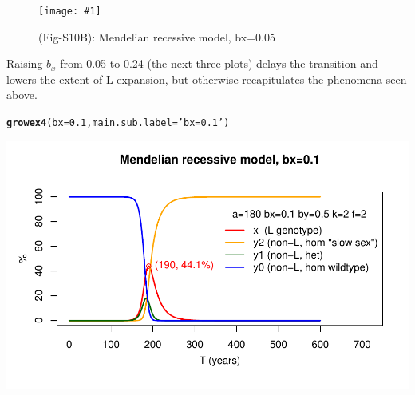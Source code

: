 \documentclass{article}\usepackage[]{graphicx}\usepackage[]{color}
\makeatletter
\def\maxwidth{ %
  \ifdim\Gin@nat@width>\linewidth
    \linewidth
  \else
    \Gin@nat@width
  \fi
}
\newcommand{\hlnum}[1]{\textcolor[rgb]{0.686,0.059,0.569}{#1}}%
\newcommand{\hlstr}[1]{\textcolor[rgb]{0.192,0.494,0.8}{#1}}%
\newcommand{\hlstd}[1]{\textcolor[rgb]{0.345,0.345,0.345}{#1}}%
\newcommand{\hlkwc}[1]{\textcolor[rgb]{0.333,0.667,0.333}{#1}}%
\newcommand{\hlkwd}[1]{\textcolor[rgb]{0.737,0.353,0.396}{\textbf{#1}}}%
\newenvironment{kframe}{%
 \def\at@end@of@kframe{}%
 \ifinner\ifhmode%
  \def\at@end@of@kframe{\end{minipage}}%
  \begin{minipage}{\columnwidth}%
 \fi\fi%
 \def\FrameCommand##1{\hskip\@totalleftmargin \hskip-\fboxsep
 \colorbox{shadecolor}{##1}\hskip-\fboxsep
     \hskip-\linewidth \hskip-\@totalleftmargin \hskip\columnwidth}%
 \MakeFramed {\advance\hsize-\width
   \@totalleftmargin\z@ \linewidth\hsize
   \@setminipage}}%
 {\par\unskip\endMakeFramed%
 \at@end@of@kframe}
\newenvironment{knitrout}{}{} %
\newcommand{\dofig}[3]{%
  \begin{figure}%
    \begin{center}%
      \texttt{[image: \#1]}%
      \caption{#2}%
      \label{#3}%
    \end{center}%
  \end{figure}%
}
\makeatother
\begin{document}
\dofig{asex-figs-mine/Fig-S10B.pdf}{(Fig-S10B): Mendelian recessive model, bx=0.05}{fig:S10B}

Raising $b_x$ from 0.05 to 0.24 (the next three plots) delays the transition and lowers the extent
of L expansion, but otherwise recapitulates the phenomena seen above.

\begin{knitrout}\footnotesize
{}\color{fgcolor}\begin{kframe}
\begin{alltt}
\hlkwd{growex4}\hlstd{(}\hlkwc{bx}\hlstd{=}\hlnum{0.1}\hlstd{,} \hlkwc{main.sub.label}\hlstd{=}\hlstr{'bx=0.1'}\hlstd{)}
\end{alltt}
\end{kframe}

{\centering \includegraphics[width=\maxwidth]{asex-figs-knitr/unnamed-chunk-21-1} 

}



\end{knitrout}
\end{document}
